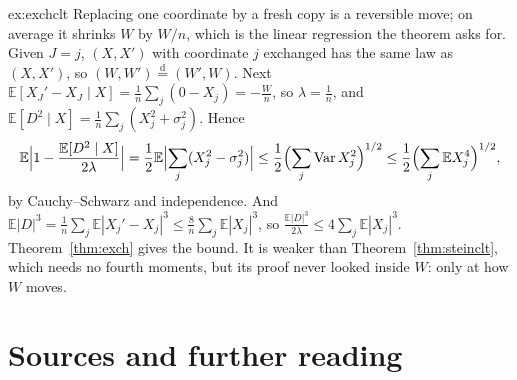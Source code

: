 \begin{solution}{ex:exchclt}
\idea Replacing one coordinate by a fresh copy is a reversible move; on average it shrinks $W$ by $W/n$, which is the linear regression the theorem asks for.
\writeup Given $J=j$, $(X,X')$ with coordinate $j$ exchanged has the same law as $(X,X')$, so $(W,W')\overset{\mathrm d}=(W',W)$. Next
$\mathbb E[X_J'-X_J\mid X]=\frac1n\sum_j(0-X_j)=-\frac Wn$, so $\lambda=\frac1n$, and $\mathbb E[D^2\mid X]=\frac1n\sum_j(X_j^2+\sigma_j^2)$. Hence
\[
\mathbb E\Bigl|1-\frac{\mathbb E[D^2\mid X]}{2\lambda}\Bigr|=\frac12\mathbb E\Bigl|\sum_j(X_j^2-\sigma_j^2)\Bigr|\le\frac12\Bigl(\sum_j\operatorname{Var}X_j^2\Bigr)^{1/2}\le\frac12\Bigl(\sum_j\mathbb EX_j^4\Bigr)^{1/2},
\]
by Cauchy--Schwarz and independence. And $\mathbb E|D|^3=\frac1n\sum_j\mathbb E|X_j'-X_j|^3\le\frac8n\sum_j\mathbb E|X_j|^3$, so $\frac{\mathbb E|D|^3}{2\lambda}\le4\sum_j\mathbb E|X_j|^3$. Theorem~\ref{thm:exch}
gives the bound. It is weaker than Theorem~\ref{thm:steinclt}, which needs no fourth moments, but its proof never looked inside $W$: only at how $W$ moves.
\end{solution}

\section*{Sources and further reading}

